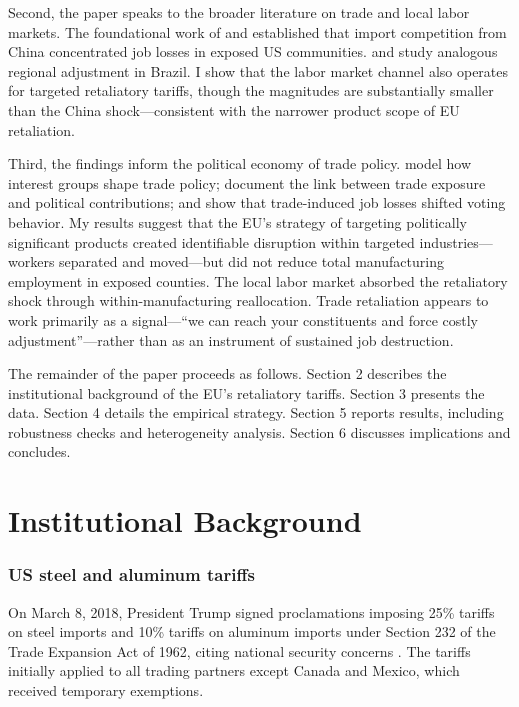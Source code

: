 \documentclass[12pt]{article}
\begin{document}
Second, the paper speaks to the broader literature on trade and local labor markets. The foundational work of \citet{autor2013china} and \citet{pierce2016surprisingly} established that import competition from China concentrated job losses in exposed US communities. \citet{kovak2013regional} and \citet{dix2017trade} study analogous regional adjustment in Brazil. I show that the labor market channel also operates for targeted retaliatory tariffs, though the magnitudes are substantially smaller than the China shock---consistent with the narrower product scope of EU retaliation.

Third, the findings inform the political economy of trade policy. \citet{che2022political} model how interest groups shape trade policy; \citet{bombardini2012trade} document the link between trade exposure and political contributions; and \citet{mccarthy2019trade} show that trade-induced job losses shifted voting behavior. My results suggest that the EU's strategy of targeting politically significant products created identifiable disruption within targeted industries---workers separated and moved---but did not reduce total manufacturing employment in exposed counties. The local labor market absorbed the retaliatory shock through within-manufacturing reallocation. Trade retaliation appears to work primarily as a signal---``we can reach your constituents and force costly adjustment''---rather than as an instrument of sustained job destruction.

The remainder of the paper proceeds as follows. Section 2 describes the institutional background of the EU's retaliatory tariffs. Section 3 presents the data. Section 4 details the empirical strategy. Section 5 reports results, including robustness checks and heterogeneity analysis. Section 6 discusses implications and concludes.


\section{Institutional Background}

\subsubsection*{US steel and aluminum tariffs} On March 8, 2018, President Trump signed proclamations imposing 25\% tariffs on steel imports and 10\% tariffs on aluminum imports under Section 232 of the Trade Expansion Act of 1962, citing national security concerns \citep{bown2019trump}. The tariffs initially applied to all trading partners except Canada and Mexico, which received temporary exemptions.
\end{document}
